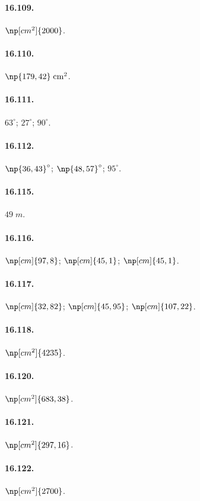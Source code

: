 \begin{multicols}{2}
\paragraph{16.109.}
$\np[cm^2]{2000}$.

\paragraph{16.110.}
$\np{179,42}\;\unit{cm^2}$.

\paragraph{16.111.}
$63^{\circ}$; $27^{\circ}$; $90^{\circ}$.

\paragraph{16.112.}
$\np{36,43}^{\circ}$; $\np{48,57}^{\circ}$; $95^{\circ}$.

\paragraph{16.115.}
$49\;\unit{m}$.

\paragraph{16.116.}
$\np[cm]{97,8}$; $\np[cm]{45,1}$; $\np[cm]{45,1}$.

\paragraph{16.117.}
$\np[cm]{32,82}$; $\np[cm]{45,95}$; $\np[cm]{107,22}$.

\paragraph{16.118.}
$\np[cm^2]{4235}$.

\paragraph{16.120.}
$\np[cm^2]{683,38}$.

\paragraph{16.121.}
$\np[cm^2]{297,16}$.

\paragraph{16.122.}
$\np[cm^2]{2700}$.


\end{multicols}

